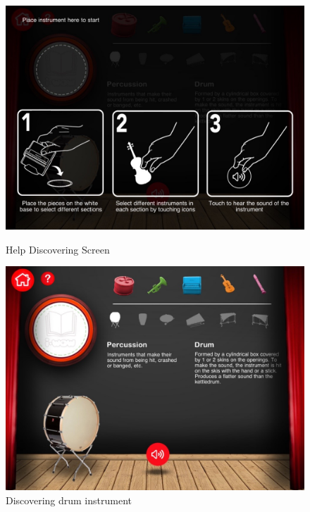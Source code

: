 \begin{figure}[ht!]
  \centering
  \includegraphics[width=350pt]{graphics/additional-screens/help_discovering_screen.jpg}
  \vspace{0.05cm}
  \caption{Help Discovering Screen}
  \vspace{0.6cm}

  \includegraphics[width=350pt]{graphics/additional-screens/discovering_perc_drum_screen.jpg}
  \vspace{0.05cm}
  \caption{Discovering drum instrument}
\end{figure}

